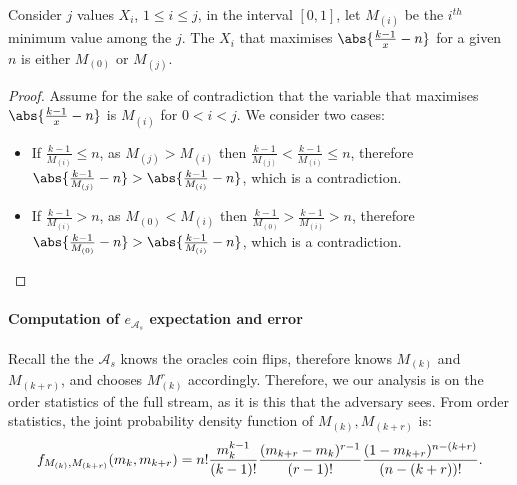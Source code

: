 \begin{claim}
    Consider $j$ values $X_i$, $1 \leq i \leq j$, in the interval $[0,1]$,
    let $M_{(i)}$ be the $i^{th}$ minimum value
    among the $j$. The $X_i$ that maximises $\abs{\frac{k-1}{x}-n}$ for a given $n$
    is either $M_{(0)}$ or $M_{(j)}$.
    \label{claim:max-val}    
\end{claim}
\begin{proof}
    Assume for the sake of contradiction that the variable that
    maximises $\abs{\frac{k-1}{x}-n}$ is $M_{(i)}$ for $0<i<j$.  We consider two cases:
    \begin{itemize}
    \item If $\frac{k-1}{M_{(i)}} \leq n$, as $M_{(j)} > M_{(i)}$ then $\frac{k-1}{M_{(j)}} < \frac{k-1}{M_{(i)}} \leq n$,
    therefore $\abs{\frac{k-1}{M_{(j)}}-n} > \abs{\frac{k-1}{M_{(i)}}-n}$, which is a contradiction.
    \item If $\frac{k-1}{M_{(i)}} > n$, as $M_{(0)} < M_{(i)}$ then $\frac{k-1}{M_{(0)}} > \frac{k-1}{M_{(i)}} > n$,
    therefore $\abs{\frac{k-1}{M_{(0)}}-n} > \abs{\frac{k-1}{M_{(i)}}-n}$, which is a contradiction.
    \end{itemize}
\end{proof}

\paragraph{Computation of $e_{{\mathcal{A}}_s}$ expectation and error} Recall the the ${\mathcal{A}}_s$ knows the oracles coin
flips, therefore knows $M_{(k)}$ and $M_{(k+r)}$, and chooses $M^r_{(k)}$ accordingly. Therefore, we our analysis
is on the order statistics of the full stream, as it is this that the adversary sees. From order statistics, the joint probability density
function of $M_{(k)}, M_{(k+r)}$ is:
\begin{align*}
f_{M_{(k)},M_{(k+r)}}(m_k,m_{k+r}) = n!{m_k^{k-1}\over (k-1)!}{(m_{k+r}-m_k)^{r-1}\over(r-1)!}{(1-m_{k+r})^{n-(k+r)}\over (n-(k+r))!}.
\end{align*}

